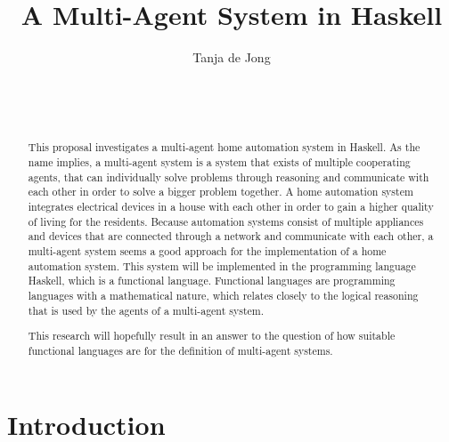 \documentclass{sig-alternate-br}
\begin{document}

\title{A Multi-Agent System in Haskell}

\author{
\alignauthor
Tanja de Jong\\
       \\
       \\
       \\
}

\maketitle
\begin{abstract}
This proposal investigates a multi-agent home automation system in Haskell. As the name implies, a multi-agent system is a system that exists of multiple cooperating agents, that can individually solve problems through reasoning and communicate with each other in order to solve a bigger problem together. A home automation system integrates electrical devices in a house with each other in order to gain a higher quality of living for the residents. Because automation systems consist of multiple appliances and devices that are connected through a network and communicate with each other, a multi-agent system seems a good approach for the implementation of a home automation system. This system will be implemented in the programming language Haskell, which is a functional language. Functional languages are programming languages with a mathematical nature, which relates closely to the logical reasoning that is used by the agents of a multi-agent system.

This research will hopefully result in an answer to the question of how suitable functional languages are for the definition of multi-agent systems.
\end{abstract}


\section{Introduction}
\end{document}
